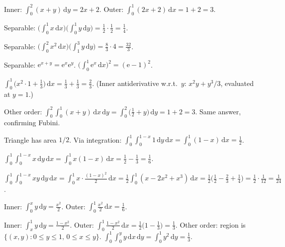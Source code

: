 \begin{solutions}
  \item Inner: $\int_{0}^{2}(x+y)\,\mathrm{d}y=2x+2$. Outer:
        $\int_{0}^{1}(2x+2)\,\mathrm{d}x=1+2=3$.

  \item Separable:
        $\bigl(\int_{0}^{1} x\,\mathrm{d}x\bigr)\bigl(\int_{0}^{1} y\,\mathrm{d}y\bigr)
        =\frac{1}{2}\cdot\frac{1}{2}=\frac{1}{4}$.

  \item Separable:
        $\bigl(\int_{0}^{2} x^{2}\,\mathrm{d}x\bigr)\bigl(\int_{1}^{3} y\,\mathrm{d}y\bigr)
        =\frac{8}{3}\cdot 4=\frac{32}{3}$.

  \item Separable: $\mathrm{e}^{x+y}=\mathrm{e}^{x}\mathrm{e}^{y}$.
        $\bigl(\int_{0}^{1} \mathrm{e}^{x}\,\mathrm{d}x\bigr)^{2}=(\mathrm{e}-1)^{2}$.

  \item $\int_{0}^{1}\bigl(x^{2}\cdot 1+\tfrac13\bigr)\,\mathrm{d}x
        =\tfrac13+\tfrac13=\tfrac23$. (Inner antiderivative w.r.t.\ $y$:
        $x^{2}y+y^{3}/3$, evaluated at $y=1$.)

  \item Other order:
        $\int_{0}^{2}\int_{0}^{1}(x+y)\,\mathrm{d}x\,\mathrm{d}y
        =\int_{0}^{2}\bigl(\tfrac12+y\bigr)\,\mathrm{d}y=1+2=3$. Same
        answer, confirming Fubini.

  \item Triangle has area $1/2$. Via integration:
        $\int_{0}^{1}\int_{0}^{1-x} 1\,\mathrm{d}y\,\mathrm{d}x
        =\int_{0}^{1}(1-x)\,\mathrm{d}x=\frac{1}{2}$.

  \item $\int_{0}^{1}\int_{0}^{1-x} x\,\mathrm{d}y\,\mathrm{d}x
        =\int_{0}^{1} x(1-x)\,\mathrm{d}x=\frac{1}{2}-\frac{1}{3}=\frac{1}{6}$.

  \item $\int_{0}^{1}\int_{0}^{1-x} xy\,\mathrm{d}y\,\mathrm{d}x
        =\int_{0}^{1} x\cdot\frac{(1-x)^{2}}{2}\,\mathrm{d}x
        =\frac{1}{2}\int_{0}^{1} (x-2x^{2}+x^{3})\,\mathrm{d}x
        =\frac{1}{2}\bigl(\tfrac12-\tfrac23+\tfrac14\bigr)
        =\frac{1}{2}\cdot\frac{1}{12}=\frac{1}{24}$.

  \item Inner: $\int_{0}^{x} y\,\mathrm{d}y=\frac{x^{2}}{2}$. Outer:
        $\int_{0}^{1} \frac{x^{2}}{2}\,\mathrm{d}x=\frac{1}{6}$.

  \item Inner: $\int_{x}^{1} y\,\mathrm{d}y=\frac{1-x^{2}}{2}$. Outer:
        $\int_{0}^{1} \frac{1-x^{2}}{2}\,\mathrm{d}x
        =\frac{1}{2}\bigl(1-\tfrac13\bigr)=\frac{1}{3}$. Other order:
        region is $\{(x,y): 0\le y\le 1,\, 0\le x\le y\}$.
        $\int_{0}^{1}\int_{0}^{y} y\,\mathrm{d}x\,\mathrm{d}y
        =\int_{0}^{1} y^{2}\,\mathrm{d}y=\frac{1}{3}$. \checkmark


\end{solutions}
